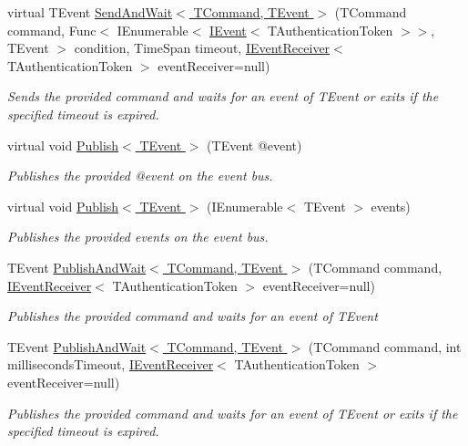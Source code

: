 \begin{DoxyCompactItemize}
virtual T\+Event \hyperlink{classCqrs_1_1Bus_1_1InProcessBus_aae598cbe7ec6f4238e5a5b966df1157c}{Send\+And\+Wait$<$ T\+Command, T\+Event $>$} (T\+Command command, Func$<$ I\+Enumerable$<$ \hyperlink{interfaceCqrs_1_1Events_1_1IEvent}{I\+Event}$<$ T\+Authentication\+Token $>$$>$, T\+Event $>$ condition, Time\+Span timeout, \hyperlink{interfaceCqrs_1_1Events_1_1IEventReceiver}{I\+Event\+Receiver}$<$ T\+Authentication\+Token $>$ event\+Receiver=null)
\begin{DoxyCompactList}\small\item\em Sends the provided {\itshape command}  and waits for an event of {\itshape T\+Event}  or exits if the specified timeout is expired. \end{DoxyCompactList}\item 
virtual void \hyperlink{classCqrs_1_1Bus_1_1InProcessBus_afd3d41a5f27a985e9d6ccf3f6f77f11a}{Publish$<$ T\+Event $>$} (T\+Event @event)
\begin{DoxyCompactList}\small\item\em Publishes the provided {\itshape @event}  on the event bus. \end{DoxyCompactList}\item 
virtual void \hyperlink{classCqrs_1_1Bus_1_1InProcessBus_ae154f274db2a028a6094677d83cc1c74}{Publish$<$ T\+Event $>$} (I\+Enumerable$<$ T\+Event $>$ events)
\begin{DoxyCompactList}\small\item\em Publishes the provided {\itshape events}  on the event bus. \end{DoxyCompactList}\item 
T\+Event \hyperlink{classCqrs_1_1Bus_1_1InProcessBus_a38c0684e313f42bfb36b40703db94ccb}{Publish\+And\+Wait$<$ T\+Command, T\+Event $>$} (T\+Command command, \hyperlink{interfaceCqrs_1_1Events_1_1IEventReceiver}{I\+Event\+Receiver}$<$ T\+Authentication\+Token $>$ event\+Receiver=null)
\begin{DoxyCompactList}\small\item\em Publishes the provided {\itshape command}  and waits for an event of {\itshape T\+Event}  \end{DoxyCompactList}\item 
T\+Event \hyperlink{classCqrs_1_1Bus_1_1InProcessBus_a977e49340f771248ddf485eeee650e04}{Publish\+And\+Wait$<$ T\+Command, T\+Event $>$} (T\+Command command, int milliseconds\+Timeout, \hyperlink{interfaceCqrs_1_1Events_1_1IEventReceiver}{I\+Event\+Receiver}$<$ T\+Authentication\+Token $>$ event\+Receiver=null)
\begin{DoxyCompactList}\small\item\em Publishes the provided {\itshape command}  and waits for an event of {\itshape T\+Event}  or exits if the specified timeout is expired. \end{DoxyCompactList}\item 
$$
\end{DoxyCompactItemize}

